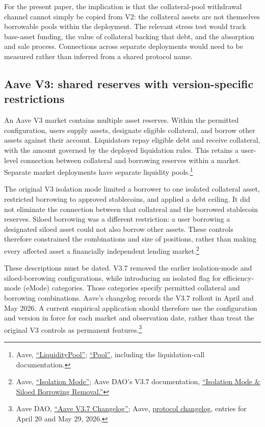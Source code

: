 \documentclass[a4paper,UKenglish,cleveref, autoref, thm-restate]{informs3}
\DeclareRobustCommand{\latestrev}[1]{{\color{red}\hypersetup{linkcolor=red,citecolor=red,urlcolor=red}#1}}
\newenvironment{latestrevisions}{\begingroup\color{red}\hypersetup{linkcolor=red,citecolor=red,urlcolor=red}}{\endgroup}
\begin{document}
\begin{latestrevisions}
For the present paper, the implication is that the collateral-pool withdrawal channel cannot simply be copied from V2: the collateral assets are not themselves borrowable pools within the deployment. The relevant stress test would track base-asset funding, the value of collateral backing that debt, and the absorption and sale process. Connections across separate deployments would need to be measured rather than inferred from a shared protocol name.

\subsection{Aave V3: shared reserves with version-specific restrictions}
\label{app:later_protocols_aave3}

An Aave V3 market contains multiple asset reserves. Within the permitted configuration, users supply assets, designate eligible collateral, and borrow other assets against their account. Liquidators repay eligible debt and receive collateral, with the amount governed by the deployed liquidation rules. This retains a user-level connection between collateral and borrowing reserves within a market. Separate market deployments have separate liquidity pools.\footnote{\latestrev{Aave, \href{https://aave.com/docs/aave-v3/concepts/liquidity-pool}{``LiquidityPool''}; \href{https://aave.com/docs/aave-v3/smart-contracts/pool}{``Pool''}, including the liquidation-call documentation.}}

The original V3 isolation mode limited a borrower to one isolated collateral asset, restricted borrowing to approved stablecoins, and applied a debt ceiling. It did not eliminate the connection between that collateral and the borrowed stablecoin reserves. Siloed borrowing was a different restriction: a user borrowing a designated siloed asset could not also borrow other assets. These controls therefore constrained the combinations and size of positions, rather than making every affected asset a financially independent lending market.\footnote{\latestrev{Aave, \href{https://aave.com/help/supplying/isolation-mode}{``Isolation Mode''}; Aave DAO's V3.7 documentation, \href{https://github.com/aave-dao/aave-v3-origin/blob/main/docs/3.7/mode-removal.md}{``Isolation Mode \& Siloed Borrowing Removal.''}}}

These descriptions must be dated. V3.7 removed the earlier isolation-mode and siloed-borrowing configurations, while introducing an isolated flag for efficiency-mode (eMode) categories. Those categories specify permitted collateral and borrowing combinations. Aave's changelog records the V3.7 rollout in April and May 2026. A current empirical application should therefore use the configuration and version in force for each market and observation date, rather than treat the original V3 controls as permanent features.\footnote{\latestrev{Aave DAO, \href{https://github.com/aave-dao/aave-v3-origin/blob/main/docs/3.7/Aave-v3.7-changelog.md}{``Aave V3.7 Changelog''}; Aave, \href{https://aave.com/docs/resources/changelog}{protocol changelog}, entries for April 20 and May 29, 2026.}}


\end{latestrevisions}
\end{document}
